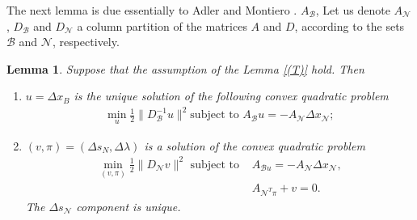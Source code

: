 \documentclass[a4paper,10 pt,titlepage,twoside]{book}
\theoremstyle{plain}
\newtheorem{lem}[thm]{Lemma}
\theoremstyle{definition}
\theoremstyle{remark}
\begin{document}
The next lemma is due essentially to Adler and Montiero \cite{ADL}. $A_{\mathcal{B}}$,  Let us denote $A_{\mathcal{N}}$, $D_{\mathcal{B}}$ and $D_{\mathcal{N}}$ a column partition of the matrices $A$ and $D$, according to the sets $\mathcal{B}$ and $\mathcal{N}$, respectively.
\begin{lem}
	Suppose that the assumption of the Lemma \ref{(T)} hold. Then
	\begin{enumerate}
		\item $u = \Delta x_{B}$ is the unique solution of the following convex quadratic problem
		\begin{align} \label{(U)}
		\min\limits_{u}\frac{1}{2}\lVert D_{\mathcal{B}}^{-1}u\rVert^{2} \text{subject to }A_{\mathcal{B}}u = -A_{\mathcal{N}}\Delta x_{\mathcal{N}};
		\end{align}
		\item $(v, \pi) = (\Delta s_{N}, \Delta \lambda)$ is a solution of the convex quadratic problem
		\begin{align}
		\min\limits_{(v, \pi)}\frac{1}{2}\lVert D_{\mathcal{N}}v\rVert^{2} \text{ subject to } &A_{\mathcal{B}u} = -A_{\mathcal{N}}\Delta x_{\mathcal{N}},\label{44}\\
		&A_{\mathcal{N}^{T}\pi}+ v =0.\label{45}		 
		\end{align}
		The $\Delta s_{\mathcal{N}}$ component is unique.
	\end{enumerate} 
\end{lem} 
\end{document}
